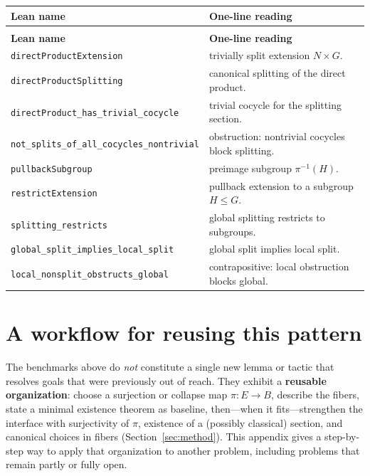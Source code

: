 \documentclass[11pt]{article}
\begin{document}
{\footnotesize
\begin{longtable}{@{}>{\raggedright\arraybackslash}p{}>{\raggedright\arraybackslash}p{}@{}}
\toprule
\textbf{Lean name} & \textbf{One-line reading} \\
\midrule
\endfirsthead
\multicolumn{2}{c}{\textit{(continued)}} \\
\toprule
\textbf{Lean name} & \textbf{One-line reading} \\
\midrule
\endhead
\bottomrule
\endfoot

\texttt{directProductExtension} & trivially split extension $N \times G$. \\
\texttt{directProductSplitting} & canonical splitting of the direct product. \\
\texttt{directProduct\_has\_trivial\_cocycle} & trivial cocycle for the splitting section. \\
\texttt{not\_splits\_of\_all\_cocycles\_nontrivial} & obstruction: nontrivial cocycles block splitting. \\
\texttt{pullbackSubgroup} & preimage subgroup $\pi^{-1}(H)$. \\
\texttt{restrictExtension} & pullback extension to a subgroup $H \le G$. \\
\texttt{splitting\_restricts} & global splitting restricts to subgroups. \\
\texttt{global\_split\_implies\_local\_split} & global split implies local split. \\
\texttt{local\_nonsplit\_obstructs\_global} & contrapositive: local obstruction blocks global. \\

\end{longtable}
}

\section{A workflow for reusing this pattern}\label{app:recipe}

The benchmarks above do \emph{not} constitute a single new lemma or tactic that resolves
goals that were previously out of reach. They exhibit a \textbf{reusable organization}:
choose a surjection or collapse map $\pi : E \to B$, describe the fibers, state a minimal
existence theorem as baseline, then---when it fits---strengthen the interface with surjectivity
of $\pi$, existence of a (possibly classical) section, and canonical choices in fibers
(Section~\ref{sec:method}). This appendix gives a step-by-step way to apply that organization
to another problem, including problems that remain partly or fully open.
\end{document}
